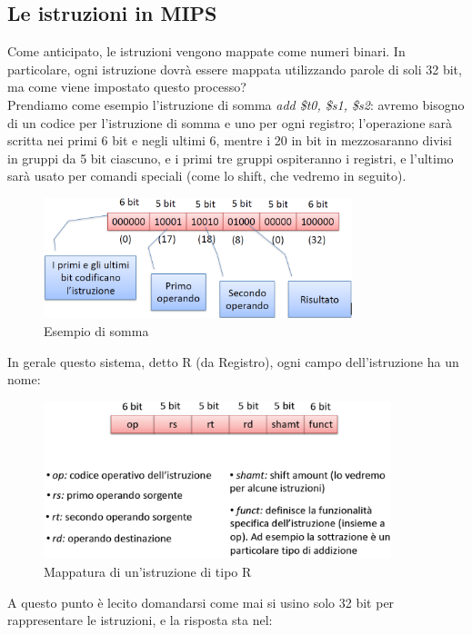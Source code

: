 \documentclass[class=book, crop=false]{standalone}
\begin{document}
\subsection{Le istruzioni in MIPS}
Come anticipato, le istruzioni vengono mappate come numeri binari. In particolare, ogni istruzione dovrà essere mappata utilizzando parole di soli 32 bit, ma come viene impostato questo processo?\\
Prendiamo come esempio l'istruzione di somma \emph{add \$t0, \$s1, \$s2}: avremo bisogno di un codice per l'istruzione di somma e uno per ogni registro; l'operazione sarà scritta nei primi 6 bit e negli ultimi 6, mentre i 20 in bit in mezzosaranno divisi in gruppi da 5 bit ciascuno, e i primi tre gruppi ospiteranno i registri, e l'ultimo sarà usato per comandi speciali (come lo shift, che vedremo in seguito).
\begin{figure}[H]
	\centering
	\includegraphics[width=0.8\textwidth,keepaspectratio]{istruzioni.png}
	\caption{Esempio di somma}
\end{figure}
In gerale questo sistema, detto R (da Registro), ogni campo dell'istruzione ha un nome:
\begin{figure}[H]
	\centering
	\includegraphics[width=0.9\textwidth,keepaspectratio]{mappatura.png}
	\caption{Mappatura di un'istruzione di tipo R}
\end{figure}
A questo punto è lecito domandarsi come mai si usino solo 32 bit per rappresentare le istruzioni, e la risposta sta nel:
\end{document}

